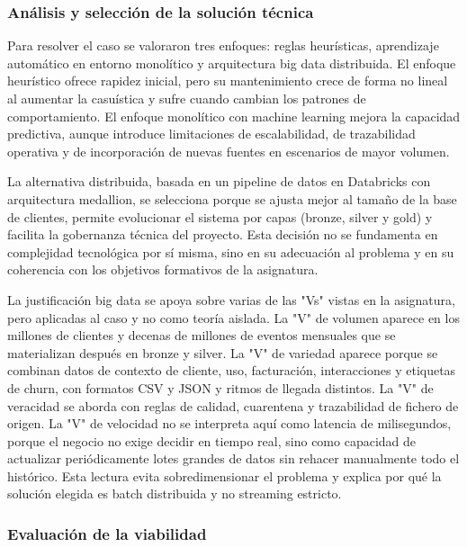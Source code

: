 \documentclass[12pt,a4paper]{article}
\begin{document}
\subsubsection{Análisis y selección de la solución técnica}

Para resolver el caso se valoraron tres enfoques: reglas heurísticas, aprendizaje automático en entorno monolítico y arquitectura big data distribuida. El enfoque heurístico ofrece rapidez inicial, pero su mantenimiento crece de forma no lineal al aumentar la casuística y sufre cuando cambian los patrones de comportamiento. El enfoque monolítico con machine learning mejora la capacidad predictiva, aunque introduce limitaciones de escalabilidad, de trazabilidad operativa y de incorporación de nuevas fuentes en escenarios de mayor volumen.\par

La alternativa distribuida, basada en un pipeline de datos en Databricks con arquitectura medallion, se selecciona porque se ajusta mejor al tamaño de la base de clientes, permite evolucionar el sistema por capas (bronze, silver y gold) y facilita la gobernanza técnica del proyecto. Esta decisión no se fundamenta en complejidad tecnológica por sí misma, sino en su adecuación al problema y en su coherencia con los objetivos formativos de la asignatura.\par

La justificación big data se apoya sobre varias de las "Vs" vistas en la asignatura, pero aplicadas al caso y no como teoría aislada. La "V" de volumen aparece en los millones de clientes y decenas de millones de eventos mensuales que se materializan después en bronze y silver. La "V" de variedad aparece porque se combinan datos de contexto de cliente, uso, facturación, interacciones y etiquetas de churn, con formatos CSV y JSON y ritmos de llegada distintos. La "V" de veracidad se aborda con reglas de calidad, cuarentena y trazabilidad de fichero de origen. La "V" de velocidad no se interpreta aquí como latencia de milisegundos, porque el negocio no exige decidir en tiempo real, sino como capacidad de actualizar periódicamente lotes grandes de datos sin rehacer manualmente todo el histórico. Esta lectura evita sobredimensionar el problema y explica por qué la solución elegida es batch distribuida y no streaming estricto.\par

\subsubsection{Evaluación de la viabilidad}
\end{document}
